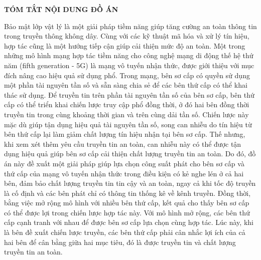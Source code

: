 \documentclass[../main.tex]{subfiles}
\begin{document}
\begin{center}
    \Large{\textbf{TÓM TẮT NỘI DUNG ĐỒ ÁN}}\\
\end{center}
\vspace{1cm}

Bảo mật lớp vật lý là một giải pháp tiềm năng giúp tăng cường an toàn thông tin trong truyền thông không dây. Cùng với các kỹ thuật mã hóa và xử lý tín hiệu, hợp tác cũng là một hướng tiếp cận giúp cải thiện mức độ an toàn. Một trong những mô hình mạng hợp tác tiềm năng cho công nghệ mạng di động thế hệ thứ năm (fifth generation - 5G) là mạng vô tuyến nhận thức, được giới thiệu với mục đích nâng cao hiệu quả sử dụng phổ. Trong mạng, bên sơ cấp có quyền sử dụng một phần tài nguyên tần số và sẵn sàng chia sẻ để các bên thứ cấp có thể khai thác sử dụng. Để truyền tin trên phần tài nguyên tần số của bên sơ cấp, bên thứ cấp có thể triển khai chiến lược truy cập phổ đồng thời, ở đó hai bên đồng thời truyền tin trong cùng khoảng thời gian và trên cùng dải tần số. Chiến lược này mặc dù giúp tận dụng hiệu quả tài nguyên tần số, song can nhiễu do tín hiệu từ bên thứ cấp lại làm giảm chất lượng tín hiệu nhận tại bên sơ cấp. Thế nhưng, khi xem xét thêm yêu cầu truyền tin an toàn, can nhiễu này có thể được tận dụng hiệu quả giúp bên sơ cấp cải thiện chất lượng truyền tin an toàn. Do đó, đồ án này đề xuất một giải pháp giúp lựa chọn công suất phát cho bên sơ cấp và thứ cấp của mạng vô tuyến nhận thức trong điều kiện có kẻ nghe lén ở cả hai bên, đảm bảo chất lượng truyền tin tin cậy và an toàn, ngay cả khi tốc độ truyền là cố định và các bên phát chỉ có thông tin thống kê về kênh truyền. Đồng thời, bằng việc mở rộng mô hình với nhiều bên thứ cấp, kết quả cho thấy bên sơ cấp có thể được lợi trong chiến lược hợp tác này. Với mô hình mở rộng, các bên thứ cấp cạnh tranh với nhau để được bên sơ cấp lựa chọn cùng hợp tác. Lúc này, khi là bên đề xuất chiến lược truyền, các bên thứ cấp phải cân nhắc lợi ích của cả hai bên để cân bằng giữa hai mục tiêu, đó là được truyền tin và chất lượng truyền tin an toàn.
\end{document}
